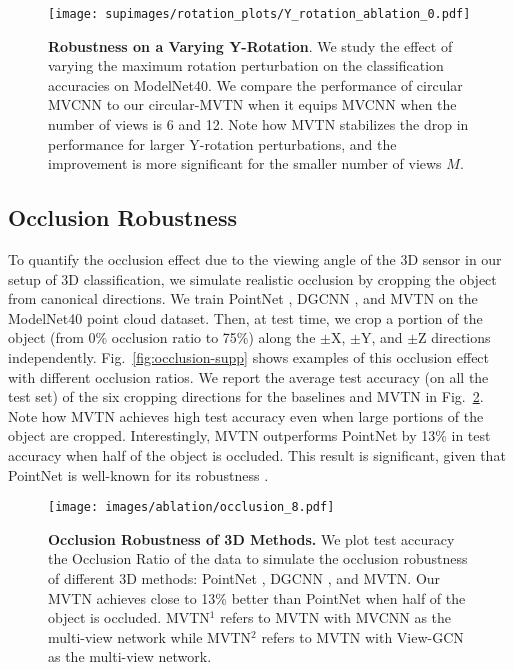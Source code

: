 \documentclass[10pt,twocolumn,letterpaper]{article}
\newcommand{\figLabel}{Fig.~}
\begin{document}
\begin{figure}[ht]
    \centering
    \texttt{[image: supimages/rotation\_plots/Y\_rotation\_ablation\_0.pdf]}
    \caption{\textbf{Robustness on a Varying Y-Rotation}. We study the effect of varying the maximum rotation perturbation on the classification accuracies on ModelNet40. We compare the performance of circular MVCNN \cite{mvcnn} to our circular-MVTN when it equips MVCNN when the number of views is 6 and 12. Note how MVTN stabilizes the drop in performance for larger Y-rotation perturbations, and the improvement is more significant for the smaller number of views $M$.}
    \label{fig:y-robustness-ablate-sup}
\end{figure}

\subsection{Occlusion Robustness} \label{sec:occlusion-supp}
To quantify the occlusion effect due to the viewing angle of the 3D sensor in our setup of 3D classification, we simulate realistic occlusion by cropping the object from canonical directions. We train PointNet \cite{pointnet}, DGCNN \cite{dgcn}, and MVTN on the ModelNet40 point cloud dataset. Then, at test time, we crop a portion of the object (from 0\% occlusion ratio to 75\%) along the $\pm$X, $\pm$Y, and $\pm$Z directions independently. \figLabel{\ref{fig:occlusion-supp}} shows examples of this occlusion effect with different occlusion ratios. We report the average test accuracy (on all the test set) of the six cropping directions for the baselines and MVTN in \figLabel{\ref{fig:occlusion}}. Note how MVTN achieves high test accuracy even when large portions of the object are cropped. Interestingly, MVTN outperforms PointNet \cite{pointnet} by 13\% in test accuracy when half of the object is occluded. This result is significant, given that PointNet is well-known for its robustness \cite{pointnet,advpc}. 
\begin{figure}[t]
    \centering
    \texttt{[image: images/ablation/occlusion\_8.pdf]}
    \caption{\textbf{Occlusion Robustness of 3D Methods.} We plot test accuracy \vs the Occlusion Ratio of the data to simulate the occlusion robustness of different 3D methods: PointNet \cite{pointnet}, DGCNN \cite{dgcn}, and MVTN. Our MVTN achieves close to 13\% better than PointNet when half of the object is occluded. MVTN$^1$ refers to MVTN with MVCNN as the multi-view network while MVTN$^2$ refers to MVTN with View-GCN as the multi-view network.}
    \label{fig:occlusion}
\end{figure}
\end{document}
